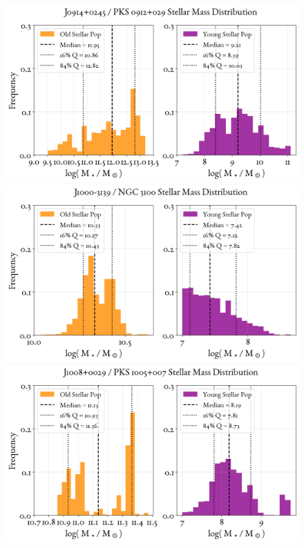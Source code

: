\begin{figure}
    \centering
    \includegraphics[width=0.8\linewidth]{figures/ResultMasses/30_MassDistri_2108.png}\\
    \includegraphics[width=0.8\linewidth]{figures/ResultMasses/35_MassDistri_3076.png}\\
    \includegraphics[width=0.8\linewidth]{figures/ResultMasses/36_MassDistri_3652.png}    
\end{figure}
